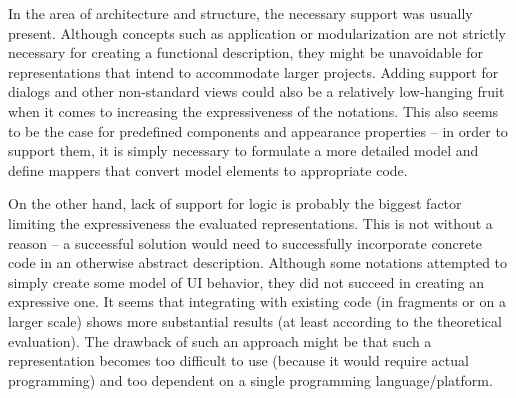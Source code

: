 In the area of architecture and structure, the necessary support was usually present.
Although concepts such as application or modularization are not strictly necessary for creating a functional description, they might be unavoidable for representations that intend to accommodate larger projects.
Adding support for dialogs and other non-standard views could also be a relatively low-hanging fruit when it comes to increasing the expressiveness of the notations.
This also seems to be the case for predefined components and appearance properties -- in order to support them, it is simply necessary to formulate a more detailed model and define mappers that convert model elements to appropriate code.

On the other hand, lack of support for logic is probably the biggest factor limiting the expressiveness the evaluated representations.
This is not without a reason -- a successful solution would need to successfully incorporate concrete code in an otherwise abstract description.
Although some notations attempted to simply create some model of UI behavior, they did not succeed in creating an expressive one.
It seems that integrating with existing code (in fragments or on a larger scale) shows more substantial results (at least according to the theoretical evaluation).
The drawback of such an approach might be that such a representation becomes too difficult to use (because it would require actual programming) and too dependent on a single programming language/platform.

